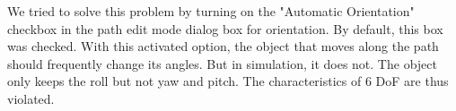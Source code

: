 We tried to solve this problem by turning on the "Automatic Orientation" checkbox in the path edit mode dialog box for orientation. By default, this box was checked. With this activated option, the object that moves along the path should frequently change its angles. But in simulation, it does not. The object only keeps the roll but not yaw and pitch. The characteristics of 6 
DoF are thus violated.







